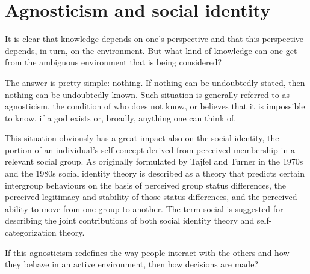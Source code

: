 \section{Agnosticism and social identity}
It is clear that knowledge depends on one’s perspective and that this perspective depends, in turn, on the environment. But what kind of knowledge can one get from the ambiguous environment that is being considered?

The answer is pretty simple: nothing. If nothing can be undoubtedly stated, then nothing can be undoubtedly known. Such situation is generally referred to as agnosticism, the condition of who does not know, or believes that it is impossible to know, if a god exists or, broadly, anything \cite{11} one can think of.

This situation obviously has a great impact also on the social identity, the portion of an individual's self-concept derived from perceived membership in a relevant social group. As originally formulated by Tajfel and Turner in the 1970s and the 1980s \cite{12} social identity theory is described as a theory that predicts certain intergroup behaviours on the basis of perceived group status differences, the perceived legitimacy and stability of those status differences, and the perceived ability to move from one group to another. The term social is suggested for describing the joint contributions of both social identity theory and self-categorization theory.

If this agnosticism redefines the way people interact with the others and how they behave in an active environment, then how decisions are made?
